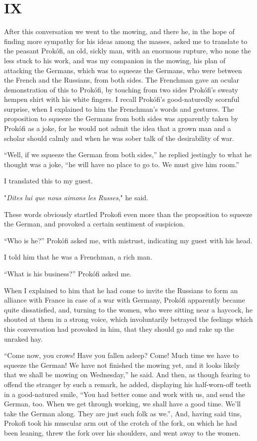 \documentclass{book}
\begin{document}
\chapter{IX}
\label{chapter-9}
After this conversation we went to the mowing, and there he, in the hope of finding more sympathy for his ideas among the masses, asked me to translate to the peasant Prokófi, an old, sickly man, with an enormous rupture, who none the less stuck to his work, and was my companion in the mowing, his plan of attacking the Germans, which was to squeeze the Germans, who were between the French and the Russians, from both sides. The Frenchman gave an ocular demonstration of this to Prokófi, by touching from two sides Prokófi’s sweaty hempen shirt with his white fingers. I recall Prokófi’s good-naturedly scornful surprise, when I explained to him the Frenchman’s words and gestures. The proposition to squeeze the Germans from both sides was apparently taken by Prokófi as a joke, for he would not admit the idea that a grown man and a scholar should calmly and when he was sober talk of the desirability of war.

“Well, if we squeeze the German from both sides,” he replied jestingly to what he thought was a joke, “he will have no place to go to. We must give him room.”

I translated this to my guest.

"\emph{Dites lui que nous aimons les Russes}," he said.

These words obviously startled Prokofi even more than the proposition to squeeze the German, and provoked a certain sentiment of suspicion.

“Who is he?” Prokófi asked me, with mistrust, indicating my guest with his head.

I told him that he was a Frenchman, a rich man.

“What is his business?” Prokófi asked me.

When I explained to him that he had come to invite the Russians to form an alliance with France in case of a war with Germany, Prokófi apparently became quite dissatisfied, and, turning to the women, who were sitting near a haycock, he shouted at them in a strong voice, which involuntarily betrayed the feelings which this conversation had provoked in him, that they should go and rake up the unraked hay.

“Come now, you crows! Have you fallen asleep? Come! Much time we have to squeeze the German! We have not finished the mowing yet, and it looks likely that we shall be mowing on Wednesday,” he said. And then, as though fearing to offend the stranger by such a remark, he added, displaying his half-worn-off teeth in a good-natured smile, “You had better come and work with us, and send the German, too. When we get through working, we shall have a good time. We’ll take the German along. They are just such folk as we.”, And, having said tins, Prokofi took his muscular arm out of the crotch of the fork, on which he had been leaning, threw the fork over his shoulders, and went away to the women.
\end{document}
